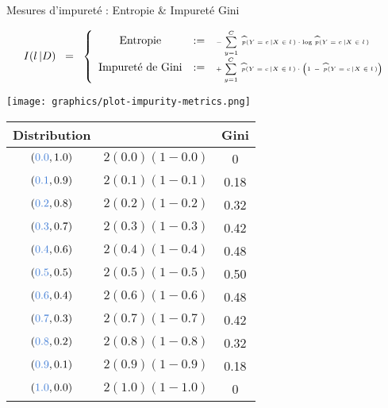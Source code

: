 \begin{frame}{\vskip -0.2cm \Large Mesures d'impuret\'e : Entropie \& Impuret\'e Gini}

\vskip -0.2cm
\tiny
\begin{equation*}
I(l\,\vert D)
\;\; = \;\;
\left\{\begin{array}{ccl}
\textnormal{Entropie}
& := &
	\textnormal{\tiny$-\;\overset{C}{\underset{y=1}{\sum}}\;\,
	\widehat{p}(Y=c\,\vert X\in l\,) \cdot \log\,\widehat{p}(Y=c\,\vert X\in l\,)$}
\\
\textnormal{Impuret\'e de Gini}
& := &
	\textnormal{\tiny$+\;\overset{C}{\underset{y=1}{\sum}}\;\,
	\widehat{p}(Y=c\,\vert X\in l\,) \cdot
	\left(\overset{{\color{white}.}}{1}\,-\,\widehat{p}(Y=c\,\vert X\in l\,)\right)$}
\end{array}\right.
\end{equation*}

\begin{multicols}{2}

	\begin{minipage}{4.5cm}
	\begin{flushright}
	\texttt{[image: graphics/plot-impurity-metrics.png]}
	\end{flushright}
	\end{minipage}

\columnbreak

	\begin{minipage}{4.5cm}
	\begin{flushright}
	{\normalsize
	\begin{tabular}{|c|c|c|}
	\hline
	{\small Distribution} && {\small Gini} \\
	\hline \hline
	$({\color{gcblue}0.0}, 1.0)$ & \textnormal{\tiny$2(0.0)(1-0.0)$} & 0 \\
	$({\color{gcblue}0.1}, 0.9)$ & \textnormal{\tiny$2(0.1)(1-0.1)$} & 0.18 \\
	$({\color{gcblue}0.2}, 0.8)$ & \textnormal{\tiny$2(0.2)(1-0.2)$} & 0.32 \\
	$({\color{gcblue}0.3}, 0.7)$ & \textnormal{\tiny$2(0.3)(1-0.3)$} & 0.42 \\
	$({\color{gcblue}0.4}, 0.6)$ & \textnormal{\tiny$2(0.4)(1-0.4)$} & 0.48 \\
	$({\color{gcblue}0.5}, 0.5)$ & \textnormal{\tiny$2(0.5)(1-0.5)$} & 0.50 \\
	$({\color{gcblue}0.6}, 0.4)$ & \textnormal{\tiny$2(0.6)(1-0.6)$} & 0.48 \\
	$({\color{gcblue}0.7}, 0.3)$ & \textnormal{\tiny$2(0.7)(1-0.7)$} & 0.42 \\
	$({\color{gcblue}0.8}, 0.2)$ & \textnormal{\tiny$2(0.8)(1-0.8)$} & 0.32 \\
	$({\color{gcblue}0.9}, 0.1)$ & \textnormal{\tiny$2(0.9)(1-0.9)$} & 0.18 \\
	$({\color{gcblue}1.0}, 0.0)$ & \textnormal{\tiny$2(1.0)(1-1.0)$} & 0      \\
	\hline
	\end{tabular}
	}
	\end{flushright}
	\end{minipage}

\end{multicols}

\end{frame}
